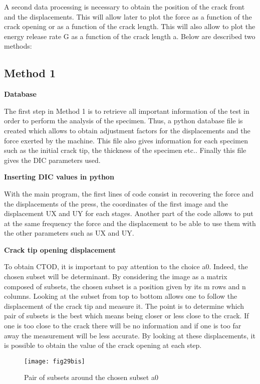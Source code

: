 A second data processing is necessary to obtain the position of the crack front and the displacements. This will allow later to plot the force as a function of the crack opening or as a function of the crack length. This will also allow to plot the energy release rate G as a function of the crack length a. Below are described two methods:

\subsection{Method 1}

\textbf{Database}

The first step in Method 1 is to retrieve all important information of the test in order to perform the analysis of the specimen. Thus, a python database file is created which allows to obtain adjustment factors for the displacements and the force exerted by the machine. This file also gives information for each specimen such as the initial crack tip, the thickness of the specimen etc.. Finally this file gives the DIC parameters used.

\textbf{Inserting DIC values in python}

With the main program, the first lines of code consist in recovering the force and the displacements of the press, the coordinates of the first image and the displacement UX and UY for each stages.
Another part of the code allows to put at the same frequency the force and the displacement to be able to use them with the other parameters such as UX and UY.

\textbf{Crack tip opening displacement}

To obtain CTOD, it is important to pay attention to the choice a0. Indeed, the chosen subset will be determinant. By considering the image as a matrix composed of subsets, the chosen subset is a position given by its m rows and n columns. Looking at the subset from top to bottom allows one to follow the displacement of the crack tip and measure it. The point is to determine which pair of subsets is the best which means being closer or less close to the crack. If one is too close to the crack there will be no information and if one is too far away the measurement will be less accurate. By looking at these displacements, it is possible to obtain the value of the crack opening at each step.

\begin{figure}[htp]
	\centering
	\texttt{[image: fig29bis]}
	\caption{Pair of subsets around the chosen subset a0}
	\label{fig:fig29bis}
\end{figure}

